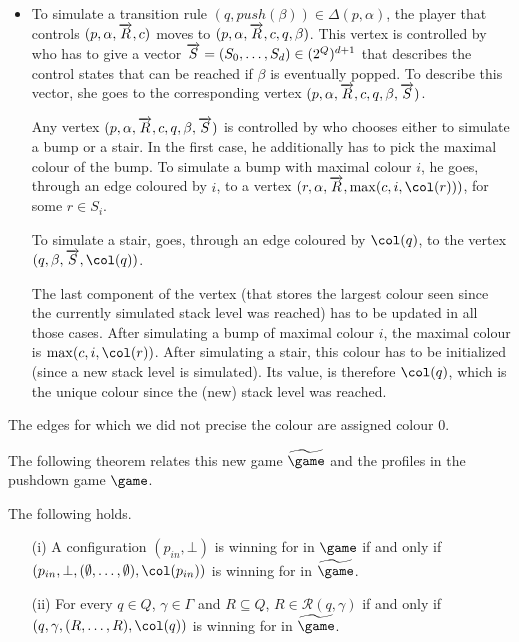 \begin{itemize}
\item To simulate a transition rule
  $(q,push(\beta))\in\Delta(p,\alpha)$, the player that controls
  $(p,\alpha,\overrightarrow{R},c)$ moves to
  $(p,\alpha,\overrightarrow{R},c,q,\beta)$. This vertex is
  controlled by \Eve who has to give a vector
$\overrightarrow{S}=(S_0,\dots,S_d)\in
(2^Q)^{d+1}$ that describes the control states that can be
  reached if $\beta$ is eventually popped. To describe this vector,
  she goes to the corresponding vertex $(p,\alpha,\overrightarrow{R},c,q,\beta,\overrightarrow{S})$.

Any vertex $(p,\alpha,\overrightarrow{R},c,q,\beta,\overrightarrow{S})$ is
controlled by \Adam who chooses either to simulate a bump or a
stair. In the first case, he additionally has to pick the maximal colour of the
bump. To simulate a bump with maximal
colour $i$, he goes, through an edge coloured by $i$, to a vertex
$(r,\alpha,\vect{R},\max(c,i,\pdscol{r}))$, for some $r\in
S_i$.

To simulate a stair, \Adam goes, through an edge coloured by $\pdscol{q}$, to the vertex
$(q,\beta,\vect{S},\pdscol{q})$.

The last component of the vertex (that stores the
largest colour seen since the currently simulated stack level was
reached) has to be updated in all those cases. After simulating a bump
of maximal colour $i$, the maximal colour is
$\max(c,i,\pdscol{r})$. After simulating a stair, this colour has to
be initialized (since a new stack level is simulated). Its value, is
therefore $\pdscol{q}$, which is the unique colour since the (new) stack
level was reached.

\end{itemize}

The edges for which we did not precise the colour are assigned colour $0$.



The following theorem relates this new game $\fgame$ and the profiles in the pushdown game $\game$.

\begin{theorem}\label{11-thm:games}
The following holds.
\begin{enumerate}
\item[(i)] A configuration $(p_{in},\bot)$ is winning for \Eve in $\game$
if and only if
$(p_{in},\bot,(\emptyset,\dots,\emptyset),\pdscol{p_{in}})$
is winning for \Eve in
$\fgame$.

\item[(ii)] For every $q\in Q$, $\gamma\in\Gamma$ and $R\subseteq Q$, $R\in\mathcal{R}(q,\gamma)$ if and only if
$(q,\gamma,(R,\dots,R),\pdscol{q})$
is winning for \Eve in
$\fgame$.
\end{enumerate}
\end{theorem}

